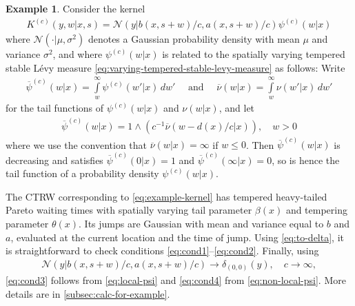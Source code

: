 \documentclass[a4paper,12pt]{elsarticle}
\numberwithin{equation}{section}
\theoremstyle{plain}
\theoremstyle{definition}
\newtheorem{example}[theorem]{Example}
\theoremstyle{remark}
\numberwithin{equation}{section}
\newcommand{\1}{\mathbf 1}
\begin{document}
\begin{example} \label{example}
Consider the kernel 
\begin{align}
\label{eq:example-kernel}
K^{(c)}(y,w|x,s) 
= \mathcal N\left(y | b(x,s+w)/c, a(x,s+w)/c\right)
\psi^{(c)}(w|x)
\end{align}
where $\mathcal N( \cdot | \mu, \sigma^2)$ denotes a Gaussian probability density with 
mean $\mu$ and variance $\sigma^2$, and where $\psi^{(c)}(w|x)$ is related to 
the spatially varying tempered stable L\'evy measure
\eqref{eq:varying-tempered-stable-levy-measure} as follows: 
Write 
\begin{align}
\overline \psi^{(c)}(w|x) = \int\limits_w^\infty \psi^{(c)}(w'|x)\,dw' 
\quad \text{ and } \quad 
\overline \nu(w|x) = \int\limits_w^\infty \nu(w'|x)\,dw'
\end{align}
for the tail functions of $\psi^{(c)}(w|x)$ and $\nu(w|x)$, and let 
\begin{align} \label{eq:def-psi}
\overline \psi^{(c)}(w|x) = 1 \wedge \left( c^{-1} \overline \nu(w-d(x)/c|x)\right), \quad w > 0
\end{align}
where we use the convention that $\overline \nu(w|x) = \infty$ if $w \le 0$. 
Then $\overline \psi^{(c)}(w|x)$ is decreasing and satisfies $\overline \psi^{(c)}(0|x) = 1$ and $\overline \psi^{(c)}(\infty|x) = 0$, so is hence the tail function of a probability density $\psi^{(c)}(w|x)$. 

The CTRW corresponding to \eqref{eq:example-kernel} has tempered heavy-tailed Pareto waiting times with spatially varying tail parameter $\beta(x)$ and tempering parameter $\theta(x)$. Its jumps are Gaussian with mean and variance equal to $b$ and $a$, evaluated at the current location and the time of jump. 
Using \eqref{eq:to-delta}, it is straightforward to check conditions \eqref{eq:cond1}--\eqref{eq:cond2}. 
Finally, using 
\begin{align}
\mathcal N\left(y | b(x,s+w)/c, a(x,s+w)/c\right) \to \delta_{(0,0)}(y), 
\quad c \to \infty,
\end{align}
\eqref{eq:cond3} follows from \eqref{eq:local-psi} and 
\eqref{eq:cond4} from \eqref{eq:non-local-psi}.
More details are in \ref{subsec:calc-for-example}.
\end{example}
\end{document}
